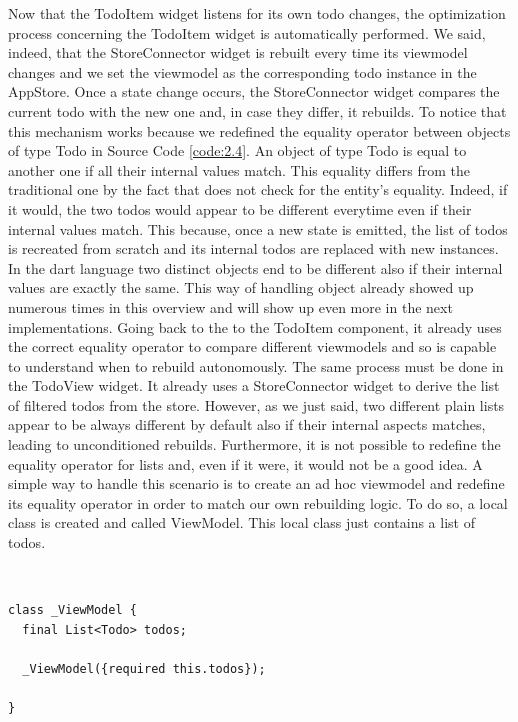 Now that the TodoItem widget listens for its own todo changes, the optimization process concerning the TodoItem widget is automatically performed. We said, indeed, that the StoreConnector widget is rebuilt every time its viewmodel changes and we set the viewmodel as the corresponding todo instance in the AppStore. Once a state change occurs, the StoreConnector widget compares the current todo with the new one and, in case they differ, it rebuilds. To notice that this mechanism works because we redefined the equality operator between objects of type Todo in Source Code \ref{code:2.4}. An object of type Todo is equal to another one if all their internal values match. This equality differs from the traditional one by the fact that does not check for the entity’s equality. Indeed, if it would, the two todos would appear to be different everytime even if their internal values match. This because, once a new state is emitted, the list of todos is recreated from scratch and its internal todos are replaced with new instances. In the dart language two distinct objects end to be different also if their internal values are exactly the same. This way of handling object already showed up numerous times in this overview and will show up even more in the next implementations. Going back to the to the TodoItem component,  it already uses the correct equality operator to compare different viewmodels and so is capable to understand when to rebuild autonomously. The same process must be done in the TodoView widget. It already uses a StoreConnector widget to derive the list of filtered todos from the store. However, as we just said, two different plain lists appear to be always different by default also if their internal aspects matches, leading to unconditioned rebuilds. Furthermore, it is not possible to redefine the equality operator for lists and, even if it were, it would not be a good idea. A simple way to handle this scenario is to create an ad hoc viewmodel and redefine its equality operator in order to match our own rebuilding logic. To do so, a local class is created and called ViewModel. This local class just contains a list of todos.
\begin{code}
\mbox{}\\
 \mbox{}
		\label{code:2.14}
\begin{verbatim}
class _ViewModel {
  final List<Todo> todos;

  _ViewModel({required this.todos});

}
\end{verbatim}
\mbox{}
\end{code}

